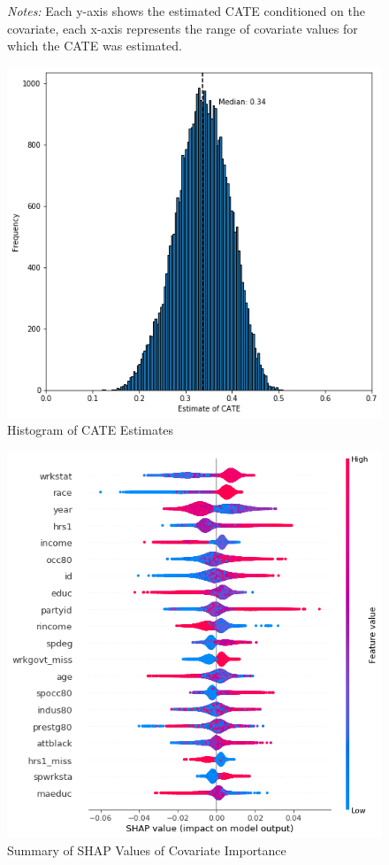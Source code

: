 \documentclass[12pt]{article}
\begin{document}
\begin{figure}[!htp]
{\begin{subfigure} [h] {0.45\linewidth}
		\vspace{0.5cm}
	\end{subfigure}}
\footnotesize
\emph{Notes:}  Each y-axis shows the estimated CATE conditioned on the covariate, each x-axis represents the range of covariate values for which the CATE was estimated.
\end{figure} 

\begin{figure}[!htp]
\caption{\label{figure:two}Histogram of CATE Estimates}
	\centering
   	 	\includegraphics[width = 0.6\linewidth]{Graphs/s1_catefreq.png}
\end{figure} 

\begin{figure}[!htp]
\caption{\label{figure:three}Summary of SHAP Values of Covariate Importance}
	\centering
   	 	\includegraphics[width = 0.6\linewidth]{Graphs/s1_shap.png}
\end{figure} 
\end{document}
